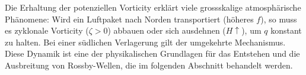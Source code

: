 Die Erhaltung der potenziellen Vorticity erklärt viele grossskalige atmosphärische Phänomene: Wird ein Luftpaket nach Norden transportiert (höheres \(f\)), so muss es zyklonale
Vorticity (\(\zeta > 0\)) abbauen oder sich ausdehnen (\(H \uparrow\)), um
\(q\) konstant zu halten. Bei einer südlichen Verlagerung gilt der umgekehrte
Mechanismus. Diese Dynamik ist eine der physikalischen Grundlagen für das
Entstehen und die Ausbreitung von Rossby-Wellen, die im folgenden Abschnitt
behandelt werden.
